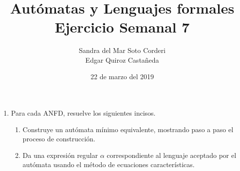 \documentclass{article}
\begin{document}
    \title{
        Autómatas y Lenguajes formales \\
        Ejercicio Semanal 7
    }

    \author{
        Sandra del Mar Soto Corderi \\
        Edgar Quiroz Castañeda
    }

    \date{
        22 de marzo del 2019
    }
    
    \maketitle

    \begin{enumerate}
        \item {
            Para cada 	ANFD, resuelve los siguientes incisos.
            \begin{enumerate}
                \item Construye un autómata mínimo equivalente, mostrando paso 
                a paso el proceso de construcción.
                
                \item Da una expresión regular $\alpha$ correspondiente al 
                lenguaje aceptado por el autómata usando el método de ecuaciones
                características.
            \end{enumerate}
        }
       \end{enumerate}
\end{document}

